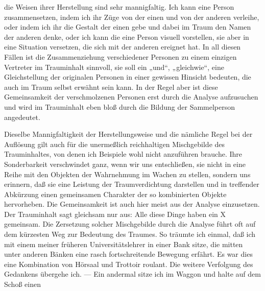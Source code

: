 \documentclass[twoside=true,titlepage=false,open=any, parskip=never, fontsize=10pt, headings=small, chapterprefix=false, appendixprefix=false]{scrbook}
\begin{document}
         
            
            
            
        \pstart
        die Weisen ihrer Herstellung sind sehr mannigfaltig. Ich kann eine
               Person zusammensetzen, indem ich ihr Züge von der einen und von der anderen
               verleihe, oder indem ich ihr die Gestalt der einen gebe und dabei im Traum den
               Namen der anderen denke, oder ich kann die eine Person visuell vorstellen, sie
               aber in eine Situation versetzen, die sich mit der anderen ereignet hat. In
               all diesen Fällen ist die Zusammenziehung verschiedener Personen zu einem
               einzigen Vertreter im Trauminhalt sinnvoll, sie soll ein „und“, „gleichwie“,
               eine Gleichstellung der originalen Personen in einer gewissen Hinsicht bedeuten,
               die auch im Traum selbst erwähnt sein kann. In der Regel aber ist diese
               Gemeinsamkeit der verschmolzenen Personen erst durch die Analyse aufzusuchen und
               wird im Trauminhalt eben bloß durch die Bildung der Sammelperson angedeutet.
        \pend
    
            
        \pstart
        Dieselbe Mannigfaltigkeit der Herstellungsweise und die nämliche Regel bei der
               Auflösung gilt auch für die unermeßlich reichhaltigen Mischgebilde
               des Trauminhaltes, von denen ich Beispiele wohl nicht anzuführen brauche. Ihre
               Sonderbarkeit verschwindet ganz, wenn wir uns entschließen, sie nicht in eine
               Reihe mit den Objekten der Wahrnehmung im Wachen zu stellen, sondern uns
               erinnern, daß sie eine Leistung der Traumverdichtung darstellen und
               in treffender Abkürzung einen gemeinsamen Charakter der so kombinierten Objekte
               hervorheben. Die Gemeinsamkeit ist auch hier meist aus der Analyse einzusetzen.
               Der Trauminhalt sagt gleichsam nur aus: Alle diese
                  Dinge haben ein X gemeinsam. Die Zersetzung solcher Mischgebilde durch
               die Analyse führt oft auf dem kürzesten Weg zur Bedeutung des Traumes. So
               träumte ich einmal, daß ich mit einem meiner früheren Universitätslehrer in
               einer Bank sitze, die mitten unter anderen Bänken eine rasch fortschreitende
               Bewegung erfährt. Es war dies eine Kombination von Hörsaal und Trottoir
               roulant. Die weitere Verfolgung des Gedankens übergehe ich. — Ein andermal
               sitze ich im Waggon und halte auf dem Schoß einen
        \pend
    
\end{document}
